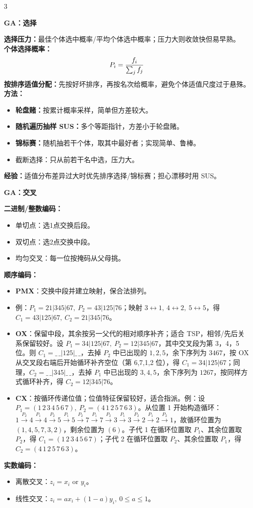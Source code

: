 \documentclass[8pt,a4paper]{ctexart}
\newcommand{\blk}[1]{%
  \par\needspace{2.2\baselineskip}%
  \vspace{1pt}\noindent
  \colorbox{black!10}{\parbox{\dimexpr\columnwidth-2\fboxsep\relax}{\textbf{#1}}}\par
  \vspace{1pt}}
\newcommand{\tightmath}[1]{\[
\vspace{-5pt}#1\vspace{-5pt}
\]}
\begin{document}
\begin{multicols*}{3}
\blk{GA：选择}
\textbf{选择压力：}最佳个体选中概率/平均个体选中概率；压力大则收敛快但易早熟。\\
\textbf{个体选择概率：}
\tightmath{P_i=\frac{f_i}{\sum_j f_j}}
\textbf{按排序适值分配：}先按好坏排序，再按名次给概率，避免个体适值尺度过于悬殊。\\
\textbf{方法：}
\begin{itemize}
\item \textbf{轮盘赌：}按累计概率采样，简单但方差较大。
\item \textbf{随机遍历抽样 SUS：}多个等距指针，方差小于轮盘赌。
\item \textbf{锦标赛：}随机抽若干个体，取其中最好者；实现简单、鲁棒。
\item 截断选择：只从前若干名中选，压力大。
\end{itemize}
\textbf{经验：}适值分布差异过大时优先排序选择/锦标赛；担心漂移时用 SUS。

\blk{GA：交叉}
\textbf{二进制/整数编码：}
\begin{itemize}
\item 单切点：选1点交换后段。
\item 双切点：选2点交换中段。
\item 均匀交叉：每一位按掩码从父母挑。
\end{itemize}
\textbf{顺序编码：}
\begin{itemize}
\item \textbf{PMX}：交换中段并建立映射，保合法排列。
\item 例：$P_1=21|345|67,\ P_2=43|125|76$；映射 $3\!\leftrightarrow\!1,\ 4\!\leftrightarrow\!2,\ 5\!\leftrightarrow\!5$，得 $C_1=43|125|67,\ C_2=21|345|76$。
\item \textbf{OX}：保留中段，其余按另一父代的相对顺序补齐；适合 TSP，相邻/先后关系保留较好。设 $P_1=34|125|67,\ P_2=12|345|67$，其中交叉段为第 3，4，5 位。则 $C_1=\_\,\_|125|\_\,\_$，去掉 $P_2$ 中已出现的 $1,2,5$，余下序列为 $3467$，按 OX 从交叉段右端后开始循环补齐空位（第 6,7,1,2 位），得 $C_1=34|125|67$；同理，$C_2=\_\,\_|345|\_\,\_$，去掉 $P_1$ 中已出现的 $3,4,5$，余下序列为 $1267$，按同样方式循环补齐，得 $C_2=12|345|76$。
\item \textbf{CX}：按循环传递位值；位值特征保留较好，适合指派。例：设 $P_1=(1\,2\,3\,4\,5\,6\,7),\ P_2=(4\,1\,2\,5\,7\,6\,3)$。从位置 1 开始构造循环：$1 \xrightarrow{P_2} 4 \xrightarrow{P_1} 4 \xrightarrow{P_2} 5 \xrightarrow{P_1} 5 \xrightarrow{P_2} 7 \xrightarrow{P_1} 7 \xrightarrow{P_2} 3 \xrightarrow{P_1} 3 \xrightarrow{P_2} 2 \xrightarrow{P_1} 2 \xrightarrow{P_2} 1$，故循环位置为 $(1,4,5,7,3,2)$，剩余位置为 $(6)$。子代 1 在循环位置取 $P_1$、其余位置取 $P_2$，得 $C_1=(1\,2\,3\,4\,5\,6\,7)$；子代 2 在循环位置取 $P_2$、其余位置取 $P_1$，得 $C_2=(4\,1\,2\,5\,7\,6\,3)$。
\end{itemize}
\textbf{实数编码：}
\begin{itemize}
\item 离散交叉：$z_i=x_i$ or $y_i$。
\item 线性交叉：$z_i=a x_i+(1-a)y_i,\ 0\le a\le1$。
\end{itemize}


\end{multicols*}
\end{document}
